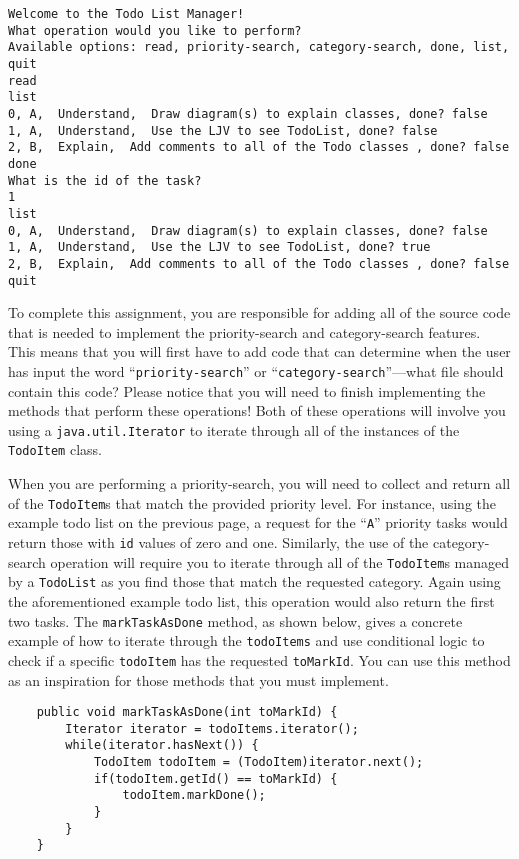 \vspace{-0.05in}
\begin{verbatim}
Welcome to the Todo List Manager!
What operation would you like to perform?
Available options: read, priority-search, category-search, done, list, quit
read
list
0, A,  Understand,  Draw diagram(s) to explain classes, done? false
1, A,  Understand,  Use the LJV to see TodoList, done? false
2, B,  Explain,  Add comments to all of the Todo classes , done? false
done
What is the id of the task?
1
list
0, A,  Understand,  Draw diagram(s) to explain classes, done? false
1, A,  Understand,  Use the LJV to see TodoList, done? true
2, B,  Explain,  Add comments to all of the Todo classes , done? false
quit
\end{verbatim}
\vspace{-0.05in}

To complete this assignment, you are responsible for adding all of the source code that is needed to implement the
priority-search and category-search features. This means that you will first have to add code that can determine when 
the user has input the word ``{\tt priority-search}'' or ``{\tt category-search}''---what file should contain this
code?  Please notice that you will need to finish implementing the methods that perform these operations! Both of these
operations will involve you using a {\tt java.util.Iterator} to iterate through all of the instances of the {\tt
  TodoItem} class. 

When you are performing a priority-search, you will need to collect and return all of the {\tt TodoItem}s that match the
provided priority level.  For instance, using the example todo list on the previous page, a request for the ``{\tt A}''
priority tasks would return those with {\tt id} values of zero and one. Similarly, the use of the category-search operation
will require you to iterate through all of the {\tt TodoItem}s managed by a {\tt TodoList} as you find those that match
the requested category. Again using the aforementioned example todo list, this operation would also return the first two tasks.
The {\tt markTaskAsDone} method, as shown below, gives a concrete example of how to iterate through the {\tt todoItems}
and use conditional logic to check if a specific {\tt todoItem} has the requested {\tt toMarkId}. You can use this
method as an inspiration for those methods that you must implement.

\vspace{-0.1in}
\begin{verbatim}
    public void markTaskAsDone(int toMarkId) {
        Iterator iterator = todoItems.iterator();
        while(iterator.hasNext()) {
            TodoItem todoItem = (TodoItem)iterator.next();
            if(todoItem.getId() == toMarkId) {
                todoItem.markDone();
            }
        }
    }
\end{verbatim}

